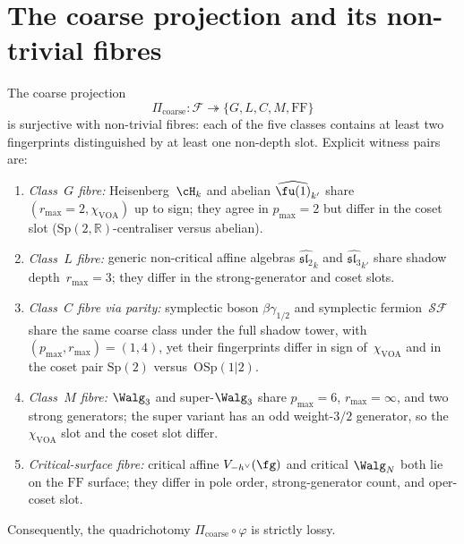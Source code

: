 \section{The coarse projection and its non-trivial fibres}
\label{sec:coarse-projection-fibres}

\begin{theorem}
\label{thm:quadrichotomy-is-coarse-projection}
\ClaimStatusProvedHere
The coarse projection
\begin{equation}\label{eq:coarse-projection-fibres}
\Pi_{\mathrm{coarse}} \colon \mathcal{F} \twoheadrightarrow \{G, L, C, M, \mathrm{FF}\}
\end{equation}
is surjective with non-trivial fibres: each of the five classes
contains at least two fingerprints distinguished by at least one
non-depth slot.
Explicit witness pairs are:
\begin{enumerate}[label=\textup{(\roman*)},leftmargin=*]
\item \emph{Class~$G$ fibre:} Heisenberg~$\cH_k$ and abelian
$\widehat{\fu(1)}_{k'}$ share $(r_{\max} = 2, \chi_{\mathrm{VOA}})$
up to sign; they agree in $p_{\max}=2$ but differ in the coset slot
\textup{(}$\mathrm{Sp}(2,\mathbb{R})$-centraliser versus abelian\textup{)}.
\item \emph{Class~$L$ fibre:} generic non-critical affine algebras
$\widehat{\mathfrak{sl}_2}_k$ and
$\widehat{\mathfrak{sl}_3}_{k'}$ share shadow depth~$r_{\max}=3$;
they differ in the strong-generator and coset slots.
\item \emph{Class~$C$ fibre via parity:} symplectic boson
$\beta\gamma_{1/2}$ and symplectic fermion~$\mathcal{SF}$ share
the same coarse class under the full shadow tower, with
$(p_{\max},r_{\max})=(1,4)$, yet their fingerprints differ in
sign of~$\chi_{\mathrm{VOA}}$ and in the coset pair
$\mathrm{Sp}(2)$ versus~$\mathrm{OSp}(1|2)$.
\item \emph{Class~$M$ fibre:} $\Walg_3$ and super-$\Walg_3$ share
$p_{\max}=6$, $r_{\max}=\infty$, and two strong generators; the
super variant has an odd weight-$3/2$ generator, so the
$\chi_{\mathrm{VOA}}$ slot and the coset slot differ.
\item \emph{Critical-surface fibre:} critical affine
$V_{-h^\vee}(\fg)$ and critical $\Walg_N$ both lie on the
$\mathrm{FF}$ surface; they differ in pole order, strong-generator
count, and oper-coset slot.
\end{enumerate}
Consequently, the quadrichotomy $\Pi_{\mathrm{coarse}}\circ\varphi$
is strictly lossy.
\end{theorem}

